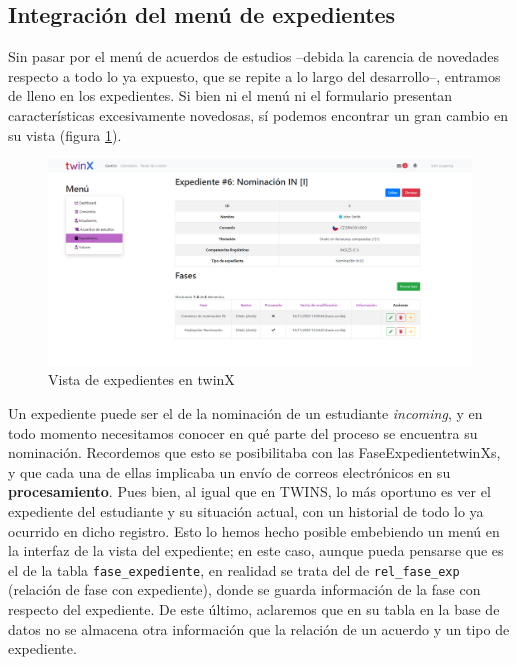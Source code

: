 \subsection{Integración del menú de expedientes}

Sin pasar por el menú de acuerdos de estudios --debida la carencia de novedades respecto a todo lo ya expuesto, que se repite a lo largo del desarrollo--, entramos de lleno en los expedientes. Si bien ni el menú ni el formulario presentan características excesivamente novedosas, sí podemos encontrar un gran cambio en su vista (figura \ref{fig:vistaexpedientetwinX}).

\begin{figure}
	\centering
	\includegraphics[width=\linewidth]{img/Capturas de twinX/vista_expediente}
	\caption{Vista de expedientes en twinX}
	\label{fig:vistaexpedientetwinX}
\end{figure}

Un expediente puede ser el de la nominación de un estudiante \textit{incoming}, y en todo momento necesitamos conocer en qué parte del proceso se encuentra su nominación. Recordemos que esto se posibilitaba con las \glspl{FaseExpedientetwinX}, y que cada una de ellas implicaba un envío de correos electrónicos en su \textbf{procesamiento}. Pues bien, al igual que en TWINS, lo más oportuno es ver el expediente del estudiante y su situación actual, con un historial de todo lo ya ocurrido en dicho registro. Esto lo hemos hecho posible embebiendo un menú en la interfaz de la vista del expediente; en este caso, aunque pueda pensarse que es el de la tabla \texttt{fase\_expediente}, en realidad se trata del de \texttt{rel\_fase\_exp} (relación de fase con expediente), donde se guarda información de la fase con respecto del expediente. De este último, aclaremos que en su tabla en la base de datos no se almacena otra información que la relación de un acuerdo y un tipo de expediente.

